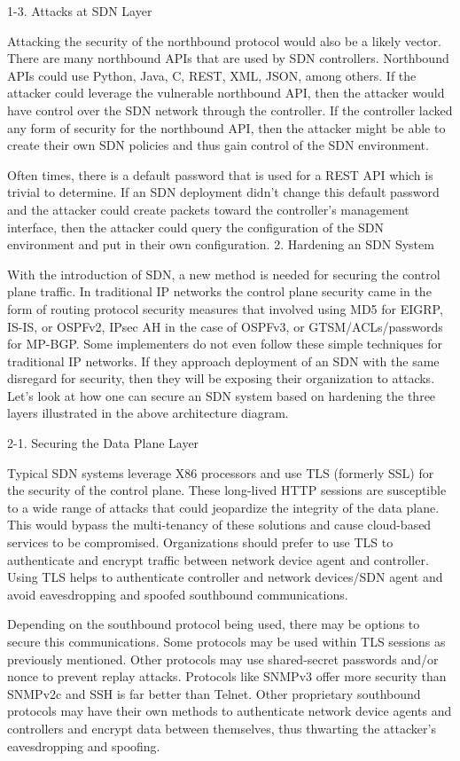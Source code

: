1-3. Attacks at SDN Layer

Attacking the security of the northbound protocol would also be a likely vector.  There are many northbound APIs that are used by SDN controllers.  Northbound APIs could use Python, Java, C, REST, XML, JSON, among others.  If the attacker could leverage the vulnerable northbound API, then the attacker would have control over the SDN network through the controller.  If the controller lacked any form of security for the northbound API, then the attacker might be able to create their own SDN policies and thus gain control of the SDN environment.

Often times, there is a default password that is used for a REST API which is trivial to determine.  If an SDN deployment didn’t change this default password and the attacker could create packets toward the controller’s management interface, then the attacker could query the configuration of the SDN environment and put in their own configuration.
2. Hardening an SDN System

With the introduction of SDN, a new method is needed for securing the control plane traffic.  In traditional IP networks the control plane security came in the form of routing protocol security measures that involved using MD5 for EIGRP, IS-IS, or OSPFv2, IPsec AH in the case of OSPFv3, or GTSM/ACLs/passwords for MP-BGP.  Some implementers do not even follow these simple techniques for traditional IP networks.  If they approach deployment of an SDN with the same disregard for security, then they will be exposing their organization to attacks.  Let’s look at how one can secure an SDN system based on hardening the three layers illustrated in the above architecture diagram.

2-1. Securing the Data Plane Layer

Typical SDN systems leverage X86 processors and use TLS (formerly SSL) for the security of the control plane.  These long-lived HTTP sessions are susceptible to a wide range of attacks that could jeopardize the integrity of the data plane.  This would bypass the multi-tenancy of these solutions and cause cloud-based services to be compromised.  Organizations should prefer to use TLS to authenticate and encrypt traffic between network device agent and controller.  Using TLS helps to authenticate controller and network devices/SDN agent and avoid eavesdropping and spoofed southbound communications.

Depending on the southbound protocol being used, there may be options to secure this communications.  Some protocols may be used within TLS sessions as previously mentioned.  Other protocols may use shared-secret passwords and/or nonce to prevent replay attacks.  Protocols like SNMPv3 offer more security than SNMPv2c and SSH is far better than Telnet.  Other proprietary southbound protocols may have their own methods to authenticate network device agents and controllers and encrypt data between themselves, thus thwarting the attacker’s eavesdropping and spoofing.


